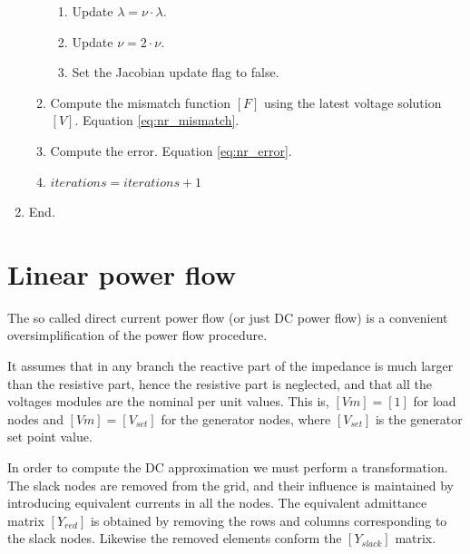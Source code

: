 \documentclass[nols,a4paper,twoside,symmetric,notoc,fleqn]{tufte-book}
\begin{document}
\begin{enumerate}
\begin{enumerate}
\begin{enumerate}
		\item Update $\lambda = \nu \cdot \lambda$.
		
		\item Update $\nu = 2 \cdot \nu$.
		
		\item Set the Jacobian update flag to false.
		\end{enumerate}
	
	\item Compute the mismatch function $[F]$ using the latest voltage solution $[V]$. Equation \ref{eq:nr_mismatch}.
	
	\item Compute the error. Equation \ref{eq:nr_error}.
	
	\item $iterations = iterations + 1$
	\end{enumerate}

\item End.
\end{enumerate}

\section{Linear power flow}\label{DCPF}
The so called direct current power flow (or just DC power flow) is a convenient oversimplification of the power flow procedure.

It assumes that in any branch the reactive part of the impedance is much larger than the resistive part, hence the resistive part is neglected, and that all the voltages modules are the nominal per unit values. This is, $[Vm]=[1]$ for load nodes and $[Vm]=[V_{set}]$ for the generator nodes, where $[V_{set}]$ is the generator set point value.

In order to compute the DC approximation we must perform a transformation. The slack nodes are removed from the grid, and their influence is maintained by introducing equivalent currents in all the nodes. The equivalent admittance matrix $[{Y}_{red}]$ is obtained by removing the rows and columns corresponding to the slack nodes. Likewise the removed elements conform the $[{Y}_{slack}]$ matrix.
\end{document}
